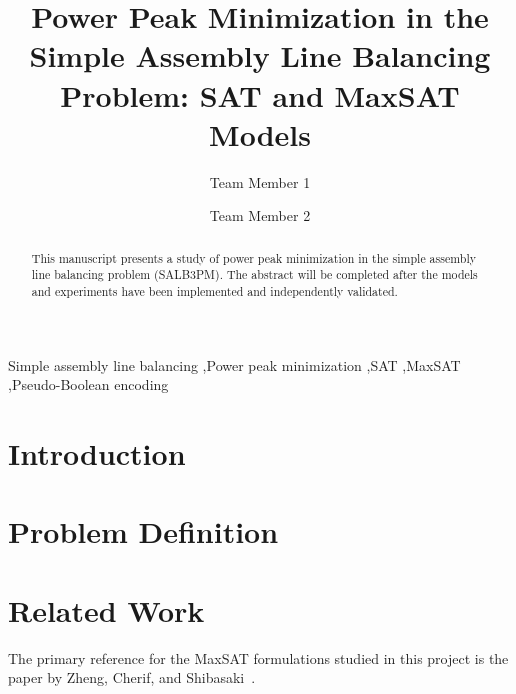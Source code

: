 \documentclass[a4paper,fleqn]{cas-sc}
\begin{document}

\title[mode = title]{Power Peak Minimization in the Simple Assembly Line Balancing Problem: SAT and MaxSAT Models}

\author[1]{Team Member 1}
\author[1]{Team Member 2}


\begin{abstract}
This manuscript presents a study of power peak minimization in the simple assembly line balancing problem (SALB3PM). The abstract will be completed after the models and experiments have been implemented and independently validated.
\end{abstract}

\begin{keywords}
Simple assembly line balancing \sep Power peak minimization \sep SAT \sep MaxSAT \sep Pseudo-Boolean encoding
\end{keywords}

\maketitle

\section{Introduction}

\section{Problem Definition}

\section{Related Work}
The primary reference for the MaxSAT formulations studied in this project is the paper by Zheng, Cherif, and Shibasaki~\citep{zheng2024powerpeaks}.
\end{document}
